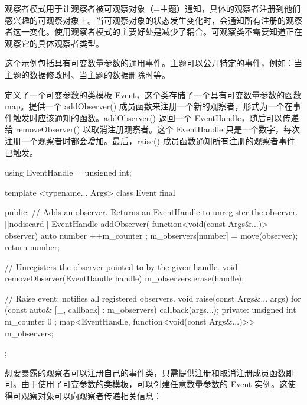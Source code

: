 
观察者模式用于让观察者被可观察对象（=主题）通知，具体的观察者注册到他们感兴趣的可观察对象上。当可观察对象的状态发生变化时，会通知所有注册的观察者这一变化。使用观察者模式的主要好处是减少了耦合。可观察类不需要知道正在观察它的具体观察者类型。


这个示例包括具有可变数量参数的通用事件。主题可以公开特定的事件，例如：当主题的数据修改时、当主题的数据删除时等。


定义了一个可变参数的类模板 Event，这个类存储了一个具有可变数量参数的函数map。提供一个 addObserver() 成员函数来注册一个新的观察者，形式为一个在事件触发时应该通知的函数。addObserver() 返回一个 EventHandle，随后可以传递给 removeObserver() 以取消注册观察者。这个 EventHandle 只是一个数字，每次注册一个观察者时都会增加。最后，raise() 成员函数通知所有注册的观察者事件已触发。

\begin{cpp}
using EventHandle = unsigned int;

template <typename... Args>
class Event final
{
    public:
        // Adds an observer. Returns an EventHandle to unregister the observer.
        [[nodiscard]] EventHandle addObserver(
        function<void(const Args&...)> observer)
        {
            auto number { ++m_counter };
            m_observers[number] = move(observer);
            return number;
        }

        // Unregisters the observer pointed to by the given handle.
        void removeObserver(EventHandle handle)
        {
            m_observers.erase(handle);
        }

        // Raise event: notifies all registered observers.
        void raise(const Args&... args)
        {
            for (const auto& [_, callback] : m_observers) { callback(args...); }
        }
    private:
        unsigned int m_counter { 0 };
        map<EventHandle, function<void(const Args&...)>> m_observers;
};
\end{cpp}

想要暴露的观察者可以注册自己的事件类，只需提供注册和取消注册成员函数即可。由于使用了可变参数的类模板，可以创建任意数量参数的 Event 实例。这使得可观察对象可以向观察者传递相关信息：

